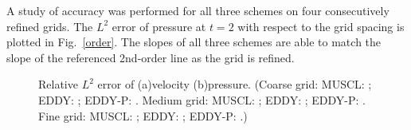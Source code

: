 A study of accuracy was performed for all three schemes on four consecutively refined grids. The $L^{2}$ error of pressure at $t=2$ with respect to the grid spacing is plotted in Fig.~\ref{order}. The slopes of all three schemes are able to match the slope of the referenced 2nd-order line as the grid is refined.
\begin{figure}[t]  
\centering
     \caption{Relative $L^{2}$ error of (a)velocity (b)pressure. (Coarse grid: MUSCL: \mliner; EDDY: \eliner; EDDY-P: \epliner. Medium grid: MUSCL: \mlineg; EDDY: \elineg; EDDY-P: \eplineg. Fine grid: MUSCL: \mlineb; EDDY: \elineb; EDDY-P: \eplineb.)}
     \label{l2}   
\end{figure}
